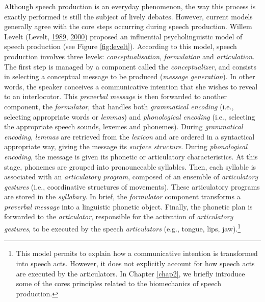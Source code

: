 \documentclass[a4paper,12pt,twoside,onecolumn,openright,final,oldfontcommands]{memoir}
\let\rmarkdownfootnote\footnote%
\def\footnote{\protect\rmarkdownfootnote}
\begin{document}
Although speech production is an everyday phenomenon, the way this process is exactly performed is still the subject of lively debates. However, current models generally agree with the core steps occurring during speech production. Willem Levelt (Levelt, \protect\hyperlink{ref-levelt_speaking_1989}{1989}, \protect\hyperlink{ref-brown_producing_2000}{2000}) proposed an influential psycholinguistic model of speech production (see Figure \ref{fig:levelt}). According to this model, speech production involves three levels: \emph{conceptualisation}, \emph{formulation} and \emph{articulation}. The first step is managed by a component called the \emph{conceptualizer}, and consists in selecting a conceptual message to be produced (\emph{message generation}). In other words, the speaker conceives a communicative intention that she wishes to reveal to an interlocutor. This \emph{preverbal message} is then forwarded to another component, the \emph{formulator}, that handles both \emph{grammatical encoding} (i.e., selecting appropriate words or \emph{lemmas}) and \emph{phonological encoding} (i.e., selecting the appropriate speech sounds, lexemes and phonemes). During \emph{grammatical encoding}, \emph{lemmas} are retrieved from the \emph{lexicon} and are ordered in a syntactical appropriate way, giving the message its \emph{surface structure}. During \emph{phonological encoding}, the message is given its phonetic or articulatory characteristics. At this stage, phonemes are grouped into pronounceable syllables. Then, each syllable is associated with an \emph{articulatory program}, composed of an ensemble of \emph{articulatory gestures} (i.e., coordinative structures of movements). These articulatory programs are stored in the \emph{syllabary}. In brief, the \emph{formulator} component transforms a \emph{preverbal message} into a linguistic phonetic object. Finally, the phonetic plan is forwarded to the \emph{articulator}, responsible for the activation of \emph{articulatory gestures}, to be executed by the speech \emph{articulators} (e.g., tongue, lips, jaw).\footnote{This model permits to explain how a communicative intention is transformed into speech acts. However, it does not explicitly account for how speech acts are executed by the articulators. In Chapter \ref{chap2}, we briefly introduce some of the cores principles related to the biomechanics of speech production.}
\end{document}
